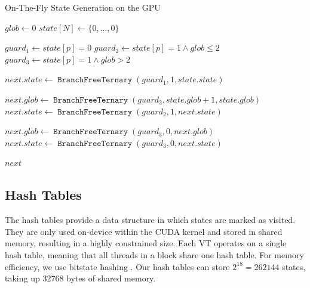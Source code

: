 \documentclass[
fancyheadings, %
%
%
]{stsreprt}
\DeclareMathOperator{\sSuccessor}{\texttt{state\_successor}}
\DeclareMathOperator{\branchFreeTernary}{\texttt{BranchFreeTernary}}
\begin{document}
\begin{algorithm}
    \caption{On-The-Fly State Generation on the GPU}
    \label{alg:on-the-fly-state-generation-on-the-gpu}
    \begin{algorithmic}
        \State $glob \gets 0$
        \State $state[N] \gets \{0, \dots, 0\}$

        \Statex

        \Function{$\sSuccessor$}{p, ndc, state}
        \State $guard_1 \gets state[p] = 0$
        \State $guard_2 \gets state[p] = 1 \land glob \leq 2$
        \State $guard_3 \gets state[p] = 1 \land glob > 2$

        \State $next.state \gets \branchFreeTernary(guard_1, 1, state.state)$

        \State $next.glob \gets \branchFreeTernary(guard_2, state.glob + 1, state.glob)$
        \State $next.state \gets \branchFreeTernary(guard_2, 1, next.state)$

        \State $next.glob \gets \branchFreeTernary(guard_3, 0, next.glob)$
        \State $next.state \gets \branchFreeTernary(guard_3, 0, next.state)$

        \Statex

        \State \Return $next$
        \EndFunction
    \end{algorithmic}
\end{algorithm}


\subsection{Hash Tables}
\label{section:implementation:hash-tables}

The hash tables provide a data structure in which states are marked as visited.
They are only used on-device within the CUDA kernel and stored in shared memory, resulting in a highly constrained size.
Each VT operates on a single hash table, meaning that all threads in a block share one hash table.
For memory efficiency, we use bitstate hashing \cite{DeFrancisco2020.Grapple}.
Our hash tables can store $2^{18}=\num{262144}$ states, taking up \num{32768} bytes of shared memory.
\end{document}

